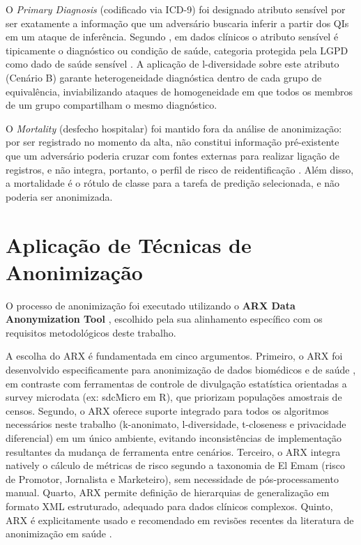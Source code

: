 O \textit{Primary Diagnosis} (codificado via ICD-9) foi designado atributo sensível por ser exatamente a informação que um adversário buscaria inferir a partir dos QIs em um ataque de inferência. Segundo , em dados clínicos o atributo sensível é tipicamente o diagnóstico ou condição de saúde, categoria protegida pela LGPD como dado de saúde sensível \cite{Brasil2018lgpd}. A aplicação de l-diversidade sobre este atributo (Cenário B) garante heterogeneidade diagnóstica dentro de cada grupo de equivalência, inviabilizando ataques de homogeneidade em que todos os membros de um grupo compartilham o mesmo diagnóstico.

O \textit{Mortality} (desfecho hospitalar) foi mantido fora da análise de anonimização: por ser registrado no momento da alta, não constitui informação pré-existente que um adversário poderia cruzar com fontes externas para realizar ligação de registros, e não integra, portanto, o perfil de risco de reidentificação \cite{ElEmam2013}. Além disso, a mortalidade é o rótulo de classe para a tarefa de predição selecionada, e não poderia ser anonimizada.

\section{Aplicação de Técnicas de Anonimização}
\label{sec:metod-anonimizacao}

O processo de anonimização foi executado utilizando o \textbf{ARX Data Anonymization Tool} \cite{Prasser2014}, escolhido pela sua alinhamento específico com os requisitos metodológicos deste trabalho.

A escolha do ARX é fundamentada em cinco argumentos. Primeiro, o ARX foi desenvolvido especificamente para anonimização de dados biomédicos e de saúde \cite{Prasser2014}, em contraste com ferramentas de controle de divulgação estatística orientadas a survey microdata (ex: sdcMicro em R), que priorizam populações amostrais de censos. Segundo, o ARX oferece suporte integrado para todos os algoritmos necessários neste trabalho (k-anonimato, l-diversidade, t-closeness e privacidade diferencial) em um único ambiente, evitando inconsistências de implementação resultantes da mudança de ferramenta entre cenários. Terceiro, o ARX integra natively o cálculo de métricas de risco segundo a taxonomia de El Emam \cite{ElEmam2013} (risco de Promotor, Jornalista e Marketeiro), sem necessidade de pós-processamento manual. Quarto, ARX permite definição de hierarquias de generalização em formato XML estruturado, adequado para dados clínicos complexos. Quinto, ARX é explicitamente usado e recomendado em revisões recentes da literatura de anonimização em saúde \cite{Vovk2023, Olatunji2024, Pilgram2024}.

